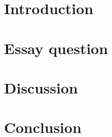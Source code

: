 \documentclass{article}
\begin{document}


\section{Introduction}
    
    
\section{Essay question}
    

\section{Discussion}
    
    
\section{Conclusion}
    

\nocite{*}
\printbibliography
\end{document}
